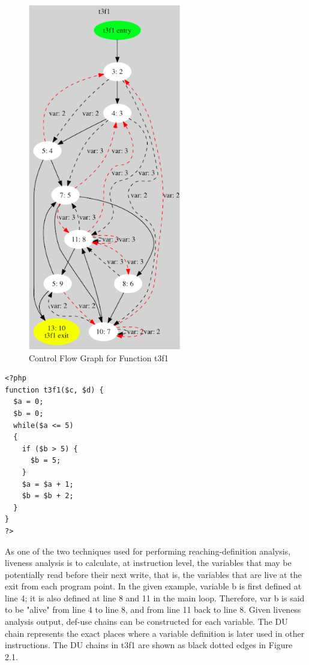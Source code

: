 \begin{figure}
\begin{minipage}{\textwidth}
\includegraphics[width=0.6\textwidth]{figures/CFG.png}
\caption{Control Flow Graph for Function t3f1}
\label{CFG}
\end{minipage}
\end{figure}

\lstset{language=PHP}
\begin{minipage}{0.5\textwidth}
\begin{lstlisting}[frame=single]
<?php
function t3f1($c, $d) {
  $a = 0;
  $b = 0;
  while($a <= 5)
  {
    if ($b > 5) {
      $b = 5;
    }
    $a = $a + 1;
    $b = $b + 2;
  }
}
?>
\end{lstlisting}
\end{minipage}
\newline

As one of the two techniques used for performing reaching-definition analysis, liveness analysis is to calculate, at instruction level, the variables that may be potentially read before their next write, that is, the variables that are live at the exit from each program point. In the given example, variable b is first defined at line 4; it is also defined at line 8 and 11 in the main loop. Therefore, var b is said to be "alive" from line 4 to line 8, and from line 11 back to line 8. Given liveness analysis output, def-use chains can be constructed for each variable. The DU chain represents the exact places where a variable definition is later used in other instructions. The DU chains in t3f1 are shown as black dotted edges in Figure 2.1.

